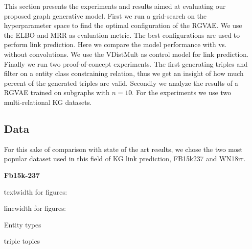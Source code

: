 
This section presents the experiments and results aimed at evaluating our proposed graph generative model. First we run a grid-search on the hyperparameter space to find the optimal configuration of the RGVAE. We use the ELBO and MRR as evaluation metric. The best configurations are used to perform link prediction. Here we compare the model performance with vs. without convolutions. We use the VDistMult as control model for link prediction. Finally we run two proof-of-concept experiments. The first generating triples and filter on a entity class constraining relation, thus we get an insight of how much percent of the generated triples are valid. Secondly we analyze the results of a RGVAE trained on subgraphs with $n=10$. For the experiments we use two multi-relational KG datasets.



\subsection{Data}
\label{ssec5:data}
For this sake of comparison with state of the art results, we chose the two most popular dataset used in this field of KG link prediction, FB15k237 and WN18rr.


\textbf{Fb15k-237}

textwidth for figures:
\prntlen{\textwidth}

linewidth for figures:
\prntlen{\linewidth}

Entity types

triple topics



